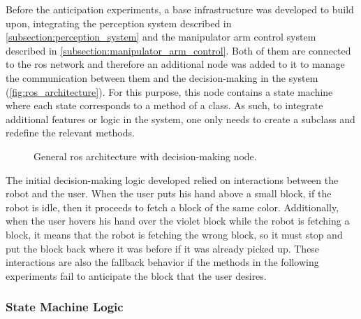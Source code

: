 Before the anticipation experiments, a base infrastructure was developed to build upon, integrating the perception system described in \autoref{subsection:perception_system} and the manipulator arm control system described in \autoref{subsection:manipulator_arm_control}. Both of them are connected to the \acs{ros} network and therefore an additional node was added to it to manage the communication between them and the decision-making in the system (\autoref{fig:ros_architecture}). For this purpose, this node contains a state machine where each state corresponds to a method of a class. As such, to integrate additional features or logic in the system, one only needs to create a subclass and redefine the relevant methods.

\begin{figure}[ht]
    \centering
    
    \caption{General \acs{ros} architecture with decision-making node.}
    \label{fig:ros_architecture}
\end{figure}

The initial decision-making logic developed relied on interactions between the robot and the user. When the user puts his hand above a small block, if the robot is idle, then it proceeds to fetch a block of the same color. Additionally, when the user hovers his hand over the violet block while the robot is fetching a block, it means that the robot is fetching the wrong block, so it must stop and put the block back where it was before if it was already picked up. These interactions are also the fallback behavior if the methods in the following experiments fail to anticipate the block that the user desires.

\subsubsection{State Machine Logic}

